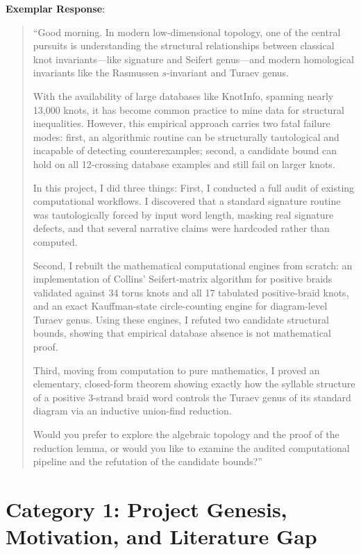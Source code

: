 \documentclass[11pt,letterpaper]{article}
\begin{document}
\begin{exemplarbox}
\textbf{Exemplar Response}:
\begin{quote}
``Good morning. In modern low-dimensional topology, one of the central pursuits is understanding the structural relationships between classical knot invariants---like signature and Seifert genus---and modern homological invariants like the Rasmussen $s$-invariant and Turaev genus.

With the availability of large databases like KnotInfo, spanning nearly 13,000 knots, it has become common practice to mine data for structural inequalities. However, this empirical approach carries two fatal failure modes: first, an algorithmic routine can be structurally tautological and incapable of detecting counterexamples; second, a candidate bound can hold on all 12-crossing database examples and still fail on larger knots.

In this project, I did three things:
First, I conducted a full audit of existing computational workflows. I discovered that a standard signature routine was tautologically forced by input word length, masking real signature defects, and that several narrative claims were hardcoded rather than computed. 

Second, I rebuilt the mathematical computational engines from scratch: an implementation of Collins' Seifert-matrix algorithm for positive braids validated against 34 torus knots and all 17 tabulated positive-braid knots, and an exact Kauffman-state circle-counting engine for diagram-level Turaev genus. Using these engines, I refuted two candidate structural bounds, showing that empirical database absence is not mathematical proof.

Third, moving from computation to pure mathematics, I proved an elementary, closed-form theorem showing exactly how the syllable structure of a positive 3-strand braid word controls the Turaev genus of its standard diagram via an inductive union-find reduction. 

Would you prefer to explore the algebraic topology and the proof of the reduction lemma, or would you like to examine the audited computational pipeline and the refutation of the candidate bounds?''
\end{quote}
\end{exemplarbox}

\newpage
\section{Category 1: Project Genesis, Motivation, and Literature Gap}
\end{document}
